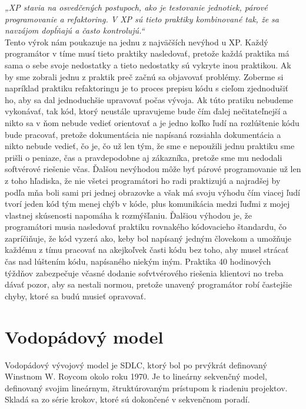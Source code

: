 \documentclass[10pt,oneside,slovak,a4paper]{article}
\begin{document}
\textit{„XP stavia na osvedčených postupoch, ako je testovanie jednotiek, párové programovanie a refaktoring. V XP sú tieto praktiky kombinované tak, že sa navzájom dopĺňajú a často kontrolujú\cite{10.5555/1076267}.“}\\

Tento výrok nám poukazuje na jednu z najväčších nevýhod u XP. Každý programátor v tíme musí tieto praktiky nasledovať, pretože každá praktika má sama o sebe svoje nedostatky a tieto nedostatky sú vykryte inou praktikou. Ak by sme zobrali jednu z praktik preč začnú sa objavovať problémy. Zoberme si napríklad praktiku refaktoringu je to proces prepisu kódu s cieľom zjednodušiť  ho, aby sa dal jednoduchšie upravovať počas vývoja. Ak túto pratiku nebudeme vykonávať, tak kód, ktorý neustále upravujeme bude čím ďalej nečitateľnejší a nikto sa v ňom nebude vedieť orientovať a je jedno koľko ľudí na rozlúštenie kódu bude pracovať, pretože dokumentácia nie napísaná rozsiahla dokumentácia a nikto nebude vedieť, čo je, čo už len tým, že sme e nepoužili jednu praktiku sme prišli o peniaze, čas a pravdepodobne aj zákazníka, pretože sme mu nedodali softvérové riešenie včas. Ďalšou nevýhodou môže byť párové programovanie už len z toho hľadiska, že nie všetci programátori ho radi praktizujú a najradšej by podľa mňa boli sami pri jednej obrazovke a však má svoju výhodu čím viacej ľudí tvorí jeden kód tým menej chýb v kóde, plus komunikácia medzi ľuďmi z mojej vlastnej  skúsenosti napomáha k rozmýšľaniu. Ďalšiou výhodou je, že programátori musia nasledovať praktiku rovnakého kódovacieho štandardu, čo zapríčiňuje, že kód vyzerá ako, keby bol  napísaný jedným človekom a umožňuje každému z tímu pracovať na akejkoľvek časti kódu bez toho, aby musel strácať čas nad lúštením kódu, napísaného niekým iným. Praktika 40 hodinových týždňov zabezpečuje včasné dodanie sofvtvérového riešenia klientovi no treba dávať pozor, aby sa nestali normou, pretože unavený programátor robí častejšie chyby, ktoré sa budú musieť opravovať. 


\section{Vodopádový model}\label{vodopad}
Vodopádový vývojový model je SDLC, ktorý bol po prvýkrát definovaný Winstnom W. Roycom okolo roku 1970\cite{Sherrell2013}. Je to lineárny sekvenčný model, definovaný svojim lineárnym, štruktúrovaným prístupom k riadeniu projektov. Skladá sa zo série krokov, ktoré sú dokončené v sekvenčnom poradí.
\end{document}
